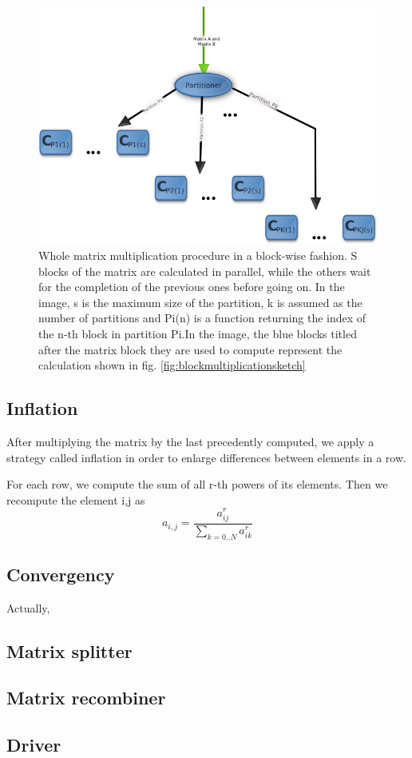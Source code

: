 \begin{figure}
\centering
\includegraphics[scale=0.7]{matrixmultiplication.png}
\caption{Whole matrix multiplication procedure in a block-wise fashion. S blocks of the matrix are calculated
in parallel, while the others wait for the completion of the previous ones before going on.
In the image, s is the maximum size of the partition, k is assumed as the number of partitions and Pi(n) is a function
returning the index of the n-th block in partition Pi.In the image, the blue blocks titled after the matrix block they are used to compute represent the calculation shown in fig. \ref{fig:blockmultiplicationsketch}}
\label{fig:matrixmultiplicationsketch}
\end{figure}

\subsection{Inflation}

After multiplying the matrix by the last precedently computed, we apply a strategy
called inflation in order to enlarge differences between elements in a row.

For each row, we compute the sum of all r-th powers of its elements.
Then we recompute the element i,j as
$$ a_{i,j} = \frac{a_{ij}^r} {\sum_{k=0..N} a_{ik}^r}$$


\subsection{Convergency}

Actually, 


\subsection{Matrix splitter}
\label{splitter}
\subsection{Matrix recombiner}
\label{recombiner}
\subsection{Driver}